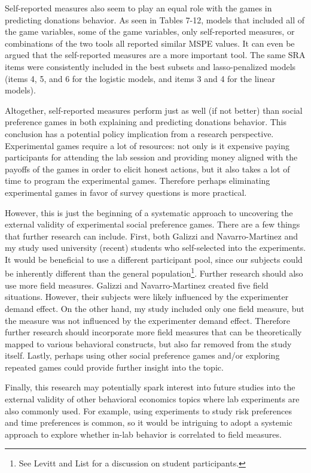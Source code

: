 \documentclass[12pt]{article}
\begin{document}
Self-reported measures also seem to play an equal role with the games in predicting donations behavior. As seen in Tables 7-12, models that included all of the game variables, some of the game variables, only self-reported measures, or combinations of the two tools all reported similar MSPE values. It can even be argued that the self-reported measures are a more important tool. The same SRA items were consistently included in the best subsets and lasso-penalized models (items 4, 5, and 6 for the logistic models, and items 3 and 4 for the linear models).

Altogether, self-reported measures perform just as well (if not better) than social preference games in both explaining and predicting donations behavior. This conclusion has a potential policy implication from a research perspective. Experimental games require a lot of resources: not only is it expensive paying participants for attending the lab session and providing money aligned with the payoffs of the games in order to elicit honest actions, but it also takes a lot of time to program the experimental games. Therefore perhaps eliminating experimental games in favor of survey questions is more practical.

However, this is just the beginning of a systematic approach to uncovering the external validity of experimental social preference games. There are a few things that further research can include. First, both Galizzi and Navarro-Martinez and my study used university (recent) students who self-selected into the experiments. It would be beneficial to use a different participant pool, since our subjects could be inherently different than the general population\footnote{See Levitt and List for a discussion on student participants.}. Further research should also use more field measures. Galizzi and Navarro-Martinez created five field situations. However, their subjects were likely influenced by the experimenter demand effect. On the other hand, my study included only one field measure, but the measure was not influenced by the experimenter demand effect. Therefore further research should incorporate more field measures that can be theoretically mapped to various behavioral constructs, but also far removed from the study itself. Lastly, perhaps using other social preference games and/or exploring repeated games could provide further insight into the topic.

Finally, this research may potentially spark interest into future studies into the external validity of other behavioral economics topics where lab experiments are also commonly used. For example, using experiments to study risk preferences and time preferences is common, so it would be intriguing to adopt a systemic approach to explore whether in-lab behavior is correlated to field measures.
\end{document}
